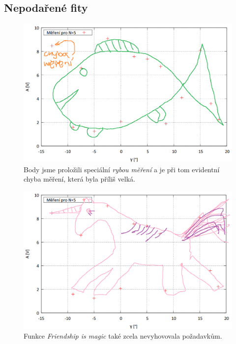 \documentclass[english]{article}
\begin{document}
\newpage
\subsection{Nepodařené fity}
	
	\begin{figure}[h]
	\begin{center}
		\includegraphics[width=\linewidth]{att/ryba.png}
		\caption{Body jsme proložili speciální \emph{rybou měření} a je při tom evidentní chyba měření, která byla příliš velká.}
		\label{fig:g_fun_1}
	\end{center}
	\end{figure}
	
	\begin{figure}[p]
	\begin{center}
		\vspace*{-1cm}
		\includegraphics[width=\linewidth]{att/jednorozec.png}
		\vspace*{-1cm}
		\caption{Funkce \emph{Friendship is magic} také zcela nevyhovovala požadavkům.}
		\label{fig:g_fun_2}
	\end{center}
	\end{figure}
	
\end{document}
